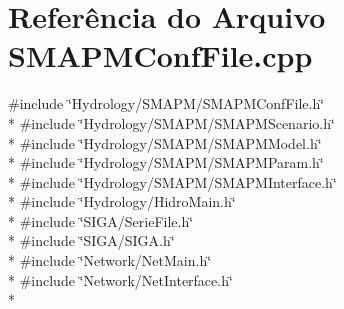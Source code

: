 \section{Referência do Arquivo S\+M\+A\+P\+M\+Conf\+File.\+cpp}
\label{_s_m_a_p_m_conf_file_8cpp}
{\ttfamily \#include \char`\"{}Hydrology/\+S\+M\+A\+P\+M/\+S\+M\+A\+P\+M\+Conf\+File.\+h\char`\"{}}\\*
{\ttfamily \#include \char`\"{}Hydrology/\+S\+M\+A\+P\+M/\+S\+M\+A\+P\+M\+Scenario.\+h\char`\"{}}\\*
{\ttfamily \#include \char`\"{}Hydrology/\+S\+M\+A\+P\+M/\+S\+M\+A\+P\+M\+Model.\+h\char`\"{}}\\*
{\ttfamily \#include \char`\"{}Hydrology/\+S\+M\+A\+P\+M/\+S\+M\+A\+P\+M\+Param.\+h\char`\"{}}\\*
{\ttfamily \#include \char`\"{}Hydrology/\+S\+M\+A\+P\+M/\+S\+M\+A\+P\+M\+Interface.\+h\char`\"{}}\\*
{\ttfamily \#include \char`\"{}Hydrology/\+Hidro\+Main.\+h\char`\"{}}\\*
{\ttfamily \#include \char`\"{}S\+I\+G\+A/\+Serie\+File.\+h\char`\"{}}\\*
{\ttfamily \#include \char`\"{}S\+I\+G\+A/\+S\+I\+G\+A.\+h\char`\"{}}\\*
{\ttfamily \#include \char`\"{}Network/\+Net\+Main.\+h\char`\"{}}\\*
{\ttfamily \#include \char`\"{}Network/\+Net\+Interface.\+h\char`\"{}}\\*
